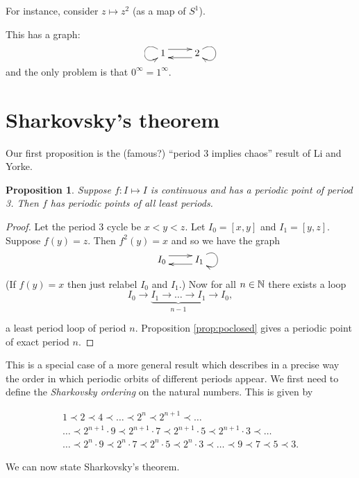 \documentclass{notes}
\theoremstyle{plain}
\newtheorem{proposition}{Proposition}[chapter]
\begin{document}
For instance, consider $z \mapsto z^2$ (as a map of $S^1$).

\vspace{1in}

This has a graph:
\[
\xymatrix{\ar @(ul,dl) 1 \ar@<1ex>[r] &
\ar@<1ex>[l] 2 \ar @(ur,dr)}
\]
and the only problem is that $0^\infty = 1^\infty$.

\section{Sharkovsky's theorem}

Our first proposition is the (famous?) ``period 3 implies chaos'' result of
Li and Yorke.

\begin{proposition}\label{prop:liandyorke}
Suppose $f \colon I \mapsto I$ is continuous and has a periodic point
of period 3.  Then $f$ has periodic points of all least periods.
\end{proposition}

\begin{proof}
Let the period 3 cycle be $x < y < z$.  Let $I_0 = [x,y]$ and
$I_1 = [y,z]$.  Suppose $f(y) = z$.  Then $f^2(y) = x$ and so
we have the graph
\[
\xymatrix{I_0 \ar@<1ex>[r] & \ar@<1ex>[l] I_1 \ar @(ur,dr)}
\]

(If $f(y) = x$ then just relabel $I_0$ and $I_1$.)  Now for all
$n \in \mathbb{N}$ there exists a loop
\[
I_0 \to \underbrace{I_1 \to \dots \to I_1}_{n-1} \to I_0,
\]

a least period loop of period $n$.  Proposition \ref{prop:poclosed}
gives a periodic point of exact period $n$.
\end{proof}

This is a special case of a more general result which describes in
a precise way the order in which periodic orbits of different periods
appear.  We first need to define the \emph{Sharkovsky ordering} on the
natural numbers.  This is given by

\begin{gather*}
1 \prec 2 \prec 4 \prec \dots \prec 2^n \prec 2^{n+1} \prec \dots \\
\dots \prec 2^{n+1} \cdot 9 \prec 2^{n+1} \cdot 7 \prec 2^{n+1} \cdot
5 \prec 2^{n+1} \cdot 3 \prec \dots \\
\dots \prec 2^n \cdot 9 \prec 2^n \cdot 7 \prec 2^n \cdot
5 \prec 2^n \cdot 3 \prec \dots \prec 9 \prec 7 \prec 5 \prec 3.
\end{gather*}

We can now state Sharkovsky's theorem.
\end{document}
